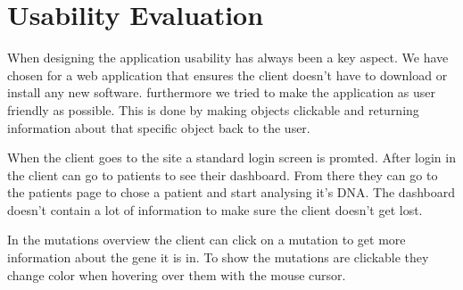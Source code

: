 \section{Usability Evaluation}
When designing the application usability has always been a key aspect.
We have chosen for a web application that ensures the client doesn't have to download or install any new software.
furthermore we tried to make the application as user friendly as possible.
This is done by making objects clickable and returning information about that specific object back to the user.

When the client goes to the site a standard login screen is promted.
After login in the client can go to patients to see their dashboard.
From there they can go to the patients page to chose a patient and start analysing it's DNA.
The dashboard doesn't contain a lot of information to make sure the client doesn't get lost.

In the mutations overview the client can click on a mutation to get more information about the gene it is in.
To show the mutations are clickable they change color when hovering over them with the mouse cursor.